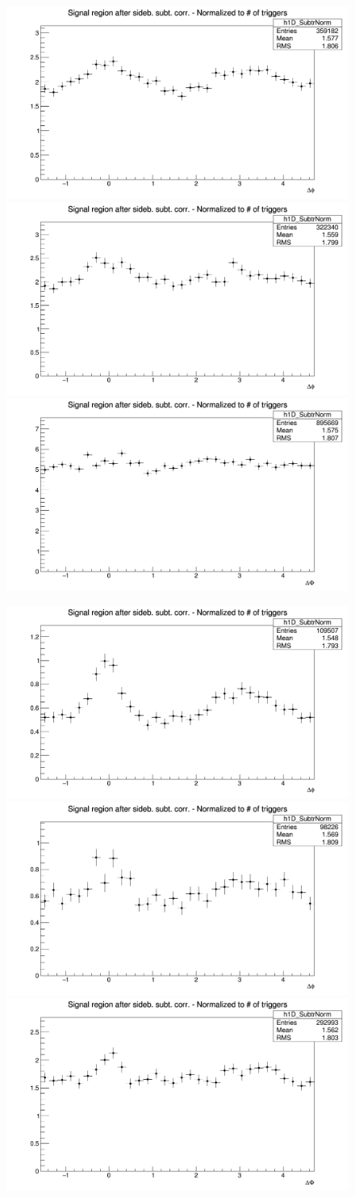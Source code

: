 \begin{figure}[!htbp]
{\includegraphics[width=0.31\linewidth, height=0.23\linewidth]{figures/Dzero/AzimCorrDistr_Dzero_Canvas_PtIntBins6to8_PoolInt_thrdot3to1dot.png}}
{\includegraphics[width=0.31\linewidth, height=0.23\linewidth]{figures/DplusPlotsweff/AzimCorrDistr_Dplus_Canvas_PtIntBins5to7_PoolInt_thrdot3to1dot.png}}
{\includegraphics[width=0.31\linewidth, height=0.23\linewidth]{figures/Dstar_wEFF/AzimCorrDistr_Dstar_Canvas_PtIntBins4to6_PoolInt_thrdot3to1dot.png}}

{\includegraphics[width=0.31\linewidth, height=0.23\linewidth]{figures/Dzero/AzimCorrDistr_Dzero_Canvas_PtIntBins6to8_PoolInt_thr1dotto2dot.png}}
{\includegraphics[width=0.31\linewidth, height=0.23\linewidth]{figures/DplusPlotsweff/AzimCorrDistr_Dplus_Canvas_PtIntBins5to7_PoolInt_thr1dotto2dot.png}}
{\includegraphics[width=0.31\linewidth, height=0.23\linewidth]{figures/Dstar_wEFF/AzimCorrDistr_Dstar_Canvas_PtIntBins4to6_PoolInt_thr1dotto2dot.png}}


\end{figure}
